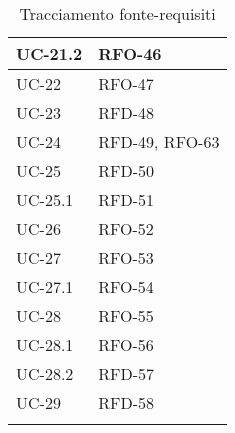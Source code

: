 \begin{xltabular}{\textwidth}{|X| X |}
    \hline
    UC-21.2 & RFO-46 \\
    \hline
    UC-22 & RFO-47  \\
    \hline
    UC-23 & RFD-48 \\
    \hline
    UC-24 & RFD-49, \newline RFO-63 \\
    \hline
    UC-25 & RFD-50  \\
    \hline
    UC-25.1 & RFD-51  \\
    \hline
    UC-26 & RFO-52 \\
    \hline
    UC-27 & RFO-53  \\
    \hline
    UC-27.1 & RFO-54 \\
    \hline
    UC-28 & RFO-55  \\
    \hline
    UC-28.1 & RFO-56 \\
    \hline
    UC-28.2 & RFD-57 \\
    \hline
    UC-29 & RFD-58 \\
   \hline
     \caption{Tracciamento fonte-requisiti}
    \label{tab:riepilogo}
\end{xltabular}

